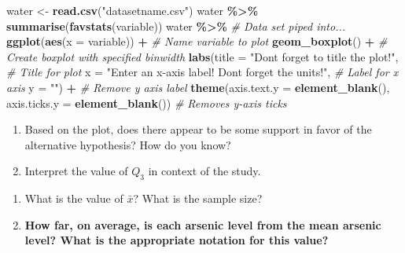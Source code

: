 \documentclass[
]{report}
\newenvironment{Shaded}{\begin{snugshade}}{\end{snugshade}}
\newcommand{\AttributeTok}[1]{\textcolor[rgb]{0.13,0.29,0.53}{#1}}
\newcommand{\CommentTok}[1]{\textcolor[rgb]{0.56,0.35,0.01}{\textit{#1}}}
\newcommand{\FunctionTok}[1]{\textcolor[rgb]{0.13,0.29,0.53}{\textbf{#1}}}
\newcommand{\NormalTok}[1]{#1}
\newcommand{\OtherTok}[1]{\textcolor[rgb]{0.56,0.35,0.01}{#1}}
\newcommand{\SpecialCharTok}[1]{\textcolor[rgb]{0.81,0.36,0.00}{\textbf{#1}}}
\newcommand{\StringTok}[1]{\textcolor[rgb]{0.31,0.60,0.02}{#1}}
\begin{document}
\begin{Shaded}
\begin{Highlighting}[]
\NormalTok{water }\OtherTok{\textless{}{-}} \FunctionTok{read.csv}\NormalTok{(}\StringTok{"datasetname.csv"}\NormalTok{)}
\NormalTok{water }\SpecialCharTok{\%\textgreater{}\%}
    \FunctionTok{summarise}\NormalTok{(}\FunctionTok{favstats}\NormalTok{(variable))}
\NormalTok{water }\SpecialCharTok{\%\textgreater{}\%} \CommentTok{\# Data set piped into...}
    \FunctionTok{ggplot}\NormalTok{(}\FunctionTok{aes}\NormalTok{(}\AttributeTok{x =}\NormalTok{ variable)) }\SpecialCharTok{+}   \CommentTok{\# Name variable to plot}
    \FunctionTok{geom\_boxplot}\NormalTok{() }\SpecialCharTok{+}  \CommentTok{\# Create boxplot with specified binwidth}
    \FunctionTok{labs}\NormalTok{(}\AttributeTok{title =} \StringTok{"Don\textquotesingle{}t forget to title the plot!"}\NormalTok{, }\CommentTok{\# Title for plot}
         \AttributeTok{x =} \StringTok{"Enter an x{-}axis label! Don\textquotesingle{}t forget the units!"}\NormalTok{, }\CommentTok{\# Label for x axis}
         \AttributeTok{y =} \StringTok{""}\NormalTok{) }\SpecialCharTok{+} \CommentTok{\# Remove y axis label}
    \FunctionTok{theme}\NormalTok{(}\AttributeTok{axis.text.y =} \FunctionTok{element\_blank}\NormalTok{(), }
          \AttributeTok{axis.ticks.y =} \FunctionTok{element\_blank}\NormalTok{()) }\CommentTok{\# Removes y{-}axis ticks}
\end{Highlighting}
\end{Shaded}

\begin{enumerate}
\def\labelenumi{\arabic{enumi}.}
\setcounter{enumi}{4}
\item
  Based on the plot, does there appear to be some support in favor of the alternative hypothesis? How do you know?
  \vspace{0.4in}
\item
  Interpret the value of \(Q_3\) in context of the study.
\end{enumerate}

\vspace{0.8in}

\begin{enumerate}
\def\labelenumi{\arabic{enumi}.}
\setcounter{enumi}{6}
\item
  What is the value of \(\bar{x}\)? What is the sample size?
  \vspace{0.25in}
\item
  \textbf{How far, on average, is each arsenic level from the mean arsenic level? What is the appropriate notation for this value?}
\end{enumerate}
\end{document}
